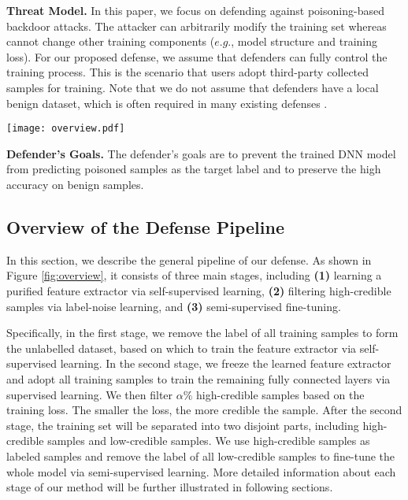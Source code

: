 \noindent \textbf{Threat Model.} 
In this paper, we focus on defending against poisoning-based backdoor attacks. The attacker can arbitrarily modify the training set whereas cannot change other training components ($e.g.$, model structure and training loss). For our proposed defense, we assume that defenders can fully control the training process. This is the scenario that users adopt third-party collected samples for training. Note that we do not assume that defenders have a local benign dataset, which is often required in many existing defenses \citep{wang2019neural,zhao2020bridging,li2021neural}. 

\begin{figure*}
    \centering
    \texttt{[image: overview.pdf]}
    \vspace{-0.5em}
    \caption{The main pipeline of our defense. In the first stage, we train the whole DNN model via self-supervised learning based on label-removed training samples. In the second stage, we freeze the learned feature extractor and adopt all training samples to train the remaining fully connected layers via supervised learning. After that, we filter high-credible samples based on the training loss. In the third stage, we adopt high-credible samples as labeled samples and remove the labels of all low-credible samples to fine-tune the whole model via semi-supervised learning. }
    \vspace{-0.3em}
    \label{fig:overview}
\end{figure*}

\noindent \textbf{Defender's Goals.} 
The defender's goals are to prevent the trained DNN model from predicting poisoned samples as the target label and to preserve the high accuracy on benign samples.

\subsection{Overview of the Defense Pipeline}
In this section, we describe the general pipeline of our defense. As shown in Figure \ref{fig:overview}, it consists of three main stages, including \textbf{(1)} learning a  purified feature extractor via self-supervised learning, \textbf{(2)} filtering high-credible samples via label-noise learning, and \textbf{(3)} semi-supervised fine-tuning. 

Specifically, in the first stage, we remove the label of all training samples to form the unlabelled dataset, based on which to train the feature extractor via self-supervised learning. In the second stage, we freeze the learned feature extractor and adopt all training samples to train the remaining fully connected layers via supervised learning. We then filter $\alpha\%$ high-credible samples based on the training loss. The smaller the loss, the more credible the sample. After the second stage, the training set will be separated into two disjoint parts, including high-credible samples and low-credible samples. We use high-credible samples as labeled samples and remove the label of all low-credible samples to fine-tune the whole model via semi-supervised learning. More detailed information about each stage of our method will be further illustrated in following sections.

